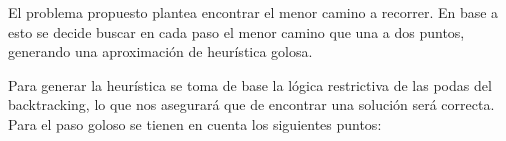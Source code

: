 



El problema propuesto plantea encontrar el menor camino a recorrer. En base a esto se decide buscar en cada paso el menor camino que una a dos puntos, generando una aproximación de heur\'istica golosa.

Para generar la heur\'istica se toma de base la lógica restrictiva de las podas del backtracking, lo que nos asegurará que de encontrar una solución será correcta. Para el paso goloso se tienen en cuenta los siguientes puntos:

